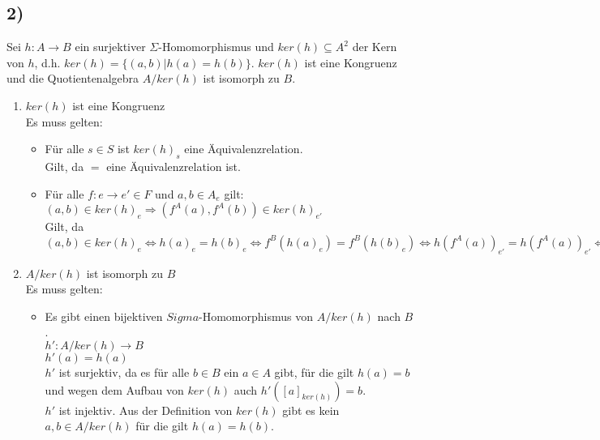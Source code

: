 \subsection*{2)}
Sei $h:A\rightarrow B$ ein surjektiver $\Sigma$-Homomorphismus und $ker(h)\subseteq A^2$ der Kern von $h$, d.h. $ker(h)=\{(a,b) | h(a)=h(b)\}$. $ker(h)$ ist eine Kongruenz und die Quotientenalgebra $A/ker(h)$ ist isomorph zu $B$.
\begin{enumerate}
\item $ker(h)$ ist eine Kongruenz\\
Es muss gelten:
\begin{itemize}
\item Für alle $s\in S$ ist $ker(h)_s$ eine Äquivalenzrelation.\\
Gilt, da $=$ eine Äquivalenzrelation ist.
\item Für alle $f: e\rightarrow e'\in F$ und $a,b\in A_e$ gilt: $(a,b)\in ker(h)_e\Rightarrow (f^A(a),f^A(b))\in ker(h)_{e'}$\\
Gilt, da $(a,b)\in ker(h)_e \Leftrightarrow h(a)_e=h(b)_e \Leftrightarrow f^B(h(a)_e)=f^B(h(b)_e) \Leftrightarrow h(f^A(a))_{e'}=h(f^A(a))_{e'} \Leftrightarrow (f^A(a),f^A(b))\in ker(h)_{e'}$\\
\end{itemize}
\item $A/ker(h)$ ist isomorph zu $B$\\
Es muss gelten:
\begin{itemize}
\item Es gibt einen bijektiven $Sigma$-Homomorphismus von $A/ker(h)$ nach $B$.\\
$h': A/ker(h) \rightarrow B$\\
$h'(a) = h(a)$\\
$h'$ ist surjektiv, da es für alle $b\in B$ ein $a\in A$ gibt, für die gilt $h(a)=b$ und wegen dem Aufbau von $ker(h)$ auch $h'([a]_{ker(h)})=b$.\\
$h'$ ist injektiv. Aus der Definition von $ker(h)$ gibt es kein $a,b\in A/ker(h)$ für die gilt $h(a)=h(b)$.
\end{itemize}
\end{enumerate}
